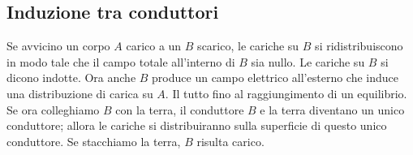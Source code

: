 \subsection{Induzione tra conduttori}
Se avvicino un corpo $A$ carico a un $B$ scarico, le cariche su $B$ si ridistribuiscono in modo tale che il campo totale all'interno di $B$ sia nullo. Le cariche su $B$ si dicono indotte. Ora anche $B$ produce un campo elettrico all'esterno che induce una distribuzione di carica su $A$. Il tutto fino al raggiungimento di un equilibrio. Se ora colleghiamo $B$ con la terra, il conduttore $B$ e la terra diventano un unico conduttore; allora le cariche si distribuiranno sulla superficie di questo unico conduttore. Se stacchiamo la terra, $B$ risulta carico.
\begin{figure}[htbp]
  \centering
  \qquad

\end{figure}
